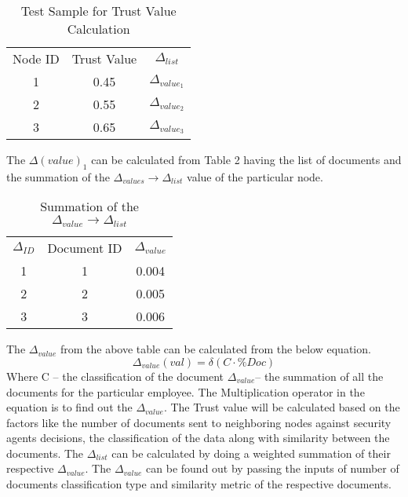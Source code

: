 \begin{table}[h!]
    \centering
    \begin{tabular}{c | c | c}
        Node ID & Trust Value & \(\Delta_{list}\) \\
        1 & 0.45 & \(\Delta_{value_1}\) \\
        2 & 0.55 & \(\Delta_{value_2}\) \\
        3 & 0.65 & \(\Delta_{value_3}\) \\
    \end{tabular}
    \caption{Test Sample for Trust Value Calculation}
    \label{tab:trust_value_calculation}
\end{table}

The \(\Delta(value)_1\) can be calculated from Table 2 having the list of
documents and the summation of the \(\Delta_{values} \to \Delta_{list} \) value of the particular node. 

\begin{table}[h!]
    \centering
    \begin{tabular}{c | c | c}
        \(\Delta_{ID} \) & Document ID & \(\Delta_{value}\) \\
        1 & 1 & 0.004 \\
        2 & 2 & 0.005 \\
        3 & 3 & 0.006 \\
    \end{tabular}
    \caption{Summation of the \(\Delta_{value} \to \Delta_{list}\)}
    \label{tab:trust_value_calculation}
\end{table}

The \(\Delta_{value}\) from the above table can be calculated from the below equation.
\begin{equation}
    \Delta_{value}(val) = \delta(C \cdot \%Doc)
\end{equation}
Where C – the classification of the document
\( \Delta_{value} \)– the summation of all the documents for the particular employee.
The Multiplication operator in the equation is to find out the \( \Delta_{value} \).
The Trust value will be calculated based on the factors like the number of
documents sent to neighboring nodes against security agents decisions, the
classification of the data along with similarity between the documents. The \(
\Delta_{list} \) can be calculated by doing a weighted summation of their respective \( \Delta_{value} \). The \( \Delta_{value} \) can be found out by passing the inputs of number of documents classification type and  similarity metric of the respective documents.

